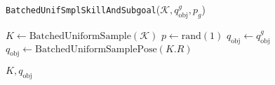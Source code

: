 \begin{algorithm}[H]
\caption{\texttt{BatchedUnifSmplSkillAndSubgoal}($\mathcal{K}, q^g_\text{obj}, p_g$)}\label{algo:UnifSmplSkillAndSubgoal}
\begin{algorithmic}[1]

\State $K \gets \text{BatchedUniformSample}(\mathcal{K})$
\State $p \leftarrow \text{rand}(1)$ 
    \State $q_{\text{obj}} \gets q^{g}_\text{obj}$
\Else
    \State $q_{\text{obj}} \gets \text{BatchedUniformSamplePose}(K.R)$
\EndIf

\State \Return $K, q_{\text{obj}}$

\end{algorithmic}
\end{algorithm}
